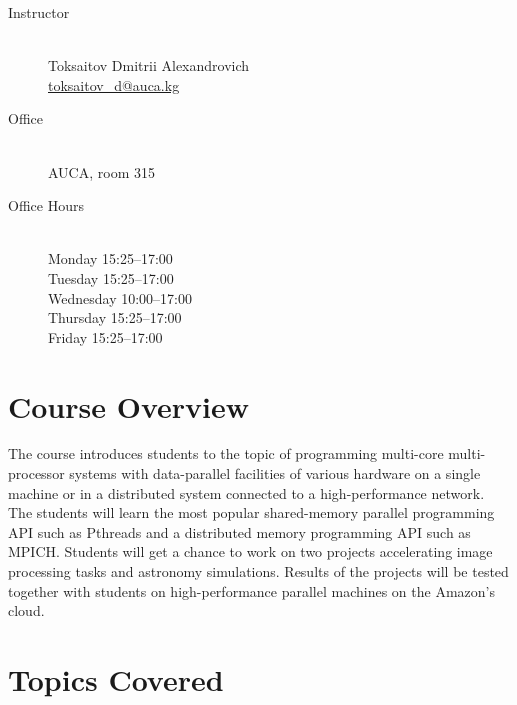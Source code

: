 \documentclass[12pt,a4paper,oneside]{article}
\begin{document}
        \begin{description}
            \item[Instructor]\hfill\\
                Toksaitov Dmitrii Alexandrovich\\
                \href{mailto:toksaitov_d@auca.kg}{toksaitov\_d@auca.kg}
            \item[Office]\hfill\\
                AUCA, room 315
            \item[Office Hours]\hfill\\
                Monday 15:25--17:00\\
                Tuesday 15:25--17:00\\
                Wednesday 10:00--17:00\\
                Thursday 15:25--17:00\\
                Friday 15:25--17:00
        \end{description}

    \section{Course Overview}

        The course introduces students to the topic of programming multi-core
        multi-processor systems with data-parallel facilities of various
        hardware on a single machine or in a distributed system connected to a
        high-performance network. The students will learn the most popular
        shared-memory parallel programming API such as Pthreads and a
        distributed memory programming API such as MPICH. Students will get a
        chance to work on two projects accelerating image processing tasks and
        astronomy simulations. Results of the projects will be tested together
        with students on high-performance parallel machines on the Amazon's
        cloud.

    \section{Topics Covered}
\end{document}
